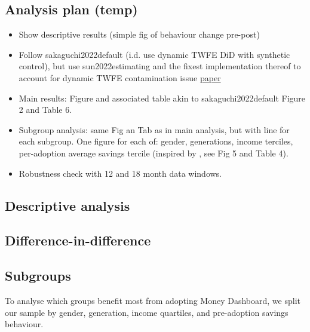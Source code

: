 \documentclass[a4paper, 11pt]{article}
\begin{document}
\subsection{Analysis plan (temp)}%
\label{sub:analysis_plan_temp_}
\begin{itemize}
    \item Show descriptive results (simple fig of behaviour change pre-post)

    \item Follow sakaguchi2022default (i.d. use dynamic TWFE DiD with synthetic
        control), but use sun2022estimating and the
        fixest implementation thereof to account for dynamic TWFE contamination
        issue
        \href{https://lrberge.github.io/fixest/articles/fixest_walkthrough.html#staggered-difference-in-differences-sun-and-abraham-2020}{paper}

    \item Main results: Figure and associated table akin to
        sakaguchi2022default Figure 2 and Table 6.

    \item Subgroup analysis: same Fig an Tab as in main analysis, but with line
        for each subgroup. One figure for each of: gender, generations, income
        terciles, per-adoption average savings tercile (inspired by
        \citet{carlin2017fintech}, see Fig 5 and Table 4).

    \item Robustness check with 12 and 18 month data windows.

\end{itemize}

\subsection{Descriptive analysis}%
\label{sub:descriptive_analysis}

\subsection{Difference-in-difference}%
\label{sub:difference_in_difference}

\subsection{Subgroups}%
\label{sub:subgroups}

To analyse which groups benefit most from adopting Money Dashboard, we split
our sample by gender, generation, income quartiles, and pre-adoption savings
behaviour.
\end{document}
